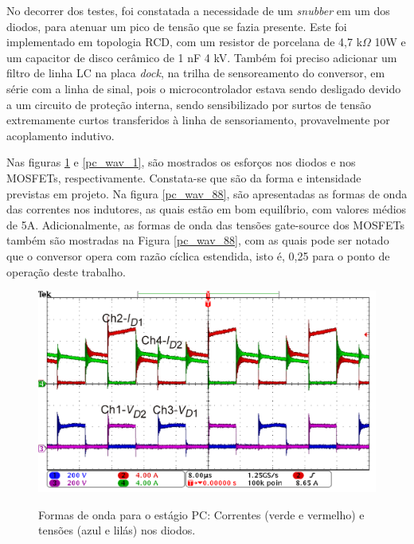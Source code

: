 \documentclass[
        12pt,
        openany, %
        oneside, %
        a4paper,			
        english,			
        brazil
        ]{abntbibufjf}
\begin{document}
No decorrer dos testes, foi constatada a necessidade de um \textit{snubber} em um dos diodos, para atenuar um pico de tensão que se fazia presente. Este foi implementado em topologia RCD, com um resistor de porcelana de 4,7 k$\Omega$ 10W e um capacitor de disco cerâmico de 1 nF 4 kV. Também foi preciso adicionar um filtro de linha LC na placa \textit{dock}, na trilha de sensoreamento do conversor, em série com a linha de sinal, pois o microcontrolador estava sendo desligado devido a um circuito de proteção interna, sendo sensibilizado por surtos de tensão extremamente curtos transferidos à linha de sensoriamento, provavelmente por acoplamento indutivo.





Nas figuras \ref{pc_wav_0} e \ref{pc_wav_1}, são mostrados os esforços nos diodos e nos MOSFETs, respectivamente. Constata-se que são da forma e intensidade previstas em projeto. Na figura \ref{pc_wav_88}, são apresentadas as formas de onda das correntes nos indutores, as quais estão em bom equilíbrio, com valores médios de 5A. Adicionalmente, as formas de onda das tensões gate-source dos MOSFETs também são mostradas na Figura \ref{pc_wav_88}, com as quais pode ser notado que o conversor opera com razão cíclica estendida, isto é, 0,25 para o ponto de operação deste trabalho.



\begin{figure}[!h]
	\centering
	\caption{Formas de onda para o estágio PC: Correntes (verde e vermelho) e tensões (azul e lilás) nos diodos.}
	\includegraphics[width=0.7\linewidth]{../FIGURAS/Figuras_TFC_Eric/Formas_de_onda/Diodos_EGIBC}
	\label{pc_wav_0}
\end{figure}
\end{document}
